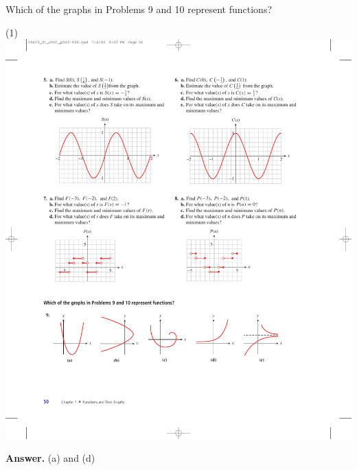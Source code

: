 \documentclass[10pt,]{book}
\theoremstyle{plain}
\theoremstyle{definition}
\theoremstyle{definition}
\theoremstyle{definition}
\theoremstyle{definition}
\numberwithin{equation}{part}
\begin{document}
\par\smallskip\noindent
\hypertarget{exercisegroup-17}{}\par\noindent Which of the graphs in Problems 9 and 10 represent functions?%
\begin{exercisegroup}(1)
\exercise[9.]\hypertarget{exercise-166}{}\includegraphics[width=1\linewidth]{images/fig-ex-1-3-9}
%
\par\smallskip
\noindent\textbf{Answer.}\hypertarget{answer-97}{}\quad
(a) and (d)%

\end{exercisegroup}
\end{document}

